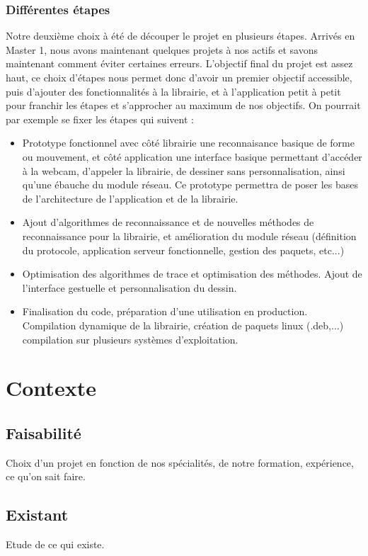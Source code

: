 \documentclass{article}
\begin{document}
				\subsubsection{Différentes étapes}
				Notre deuxième choix à été de découper le projet en plusieurs étapes. Arrivés en Master 1, nous avons maintenant quelques projets à nos actifs et savons maintenant comment éviter certaines erreurs. L'objectif final du projet est assez haut, ce choix d'étapes nous permet donc d'avoir un premier objectif accessible, puis d'ajouter des fonctionnalités à la librairie, et à l'application petit à petit pour franchir les étapes et s'approcher au maximum de nos objectifs. On pourrait par exemple se fixer les étapes qui suivent : \\
				\begin{itemize}
					\item{Prototype fonctionnel avec côté librairie une reconnaisance basique de forme ou mouvement, et côté application une interface basique permettant d'accéder à la webcam, d'appeler la librairie, de dessiner sans personnalisation, ainsi qu'une ébauche du module réseau. Ce prototype permettra de poser les bases de l'architecture de l'application et de la librairie.}
					\item{Ajout d'algorithmes de reconnaissance et de nouvelles méthodes de reconnaissance pour la librairie, et amélioration du module réseau (définition du protocole, application serveur fonctionnelle, gestion des paquets, etc...)}
					\item{Optimisation des algorithmes de trace et optimisation des méthodes. Ajout de l'interface gestuelle et personnalisation du dessin.}
					\item{Finalisation du code, préparation d'une utilisation en production. Compilation dynamique de la librairie, création de paquets linux (.deb,...) compilation sur plusieurs systèmes d'exploitation.}
				\end{itemize}
	\section{Contexte}
		\subsection{Faisabilité}
			Choix d'un projet en fonction de nos spécialités, de notre formation, expérience, ce qu'on sait faire.
		\subsection{Existant}
			Etude de ce qui existe.
\end{document}
